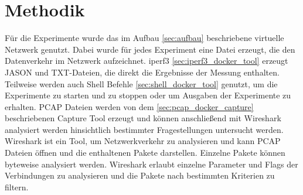 \section{Methodik}
\label{sec:allgemeine_methodik}

Für die Experimente wurde das im Aufbau \ref{sec:aufbau} beschriebene virtuelle Netzwerk genutzt.
Dabei wurde für jedes Experiment eine Datei erzeugt, die den Datenverkehr im Netzwerk aufzeichnet.
iperf3 \ref{sec:iperf3_docker_tool} erzeugt JASON und TXT-Dateien, die direkt die Ergebnisse der Messung enthalten.
Teilweise werden auch Shell Befehle \ref{sec:shell_docker_tool} genutzt, um die Experimente zu starten und zu stoppen oder um Ausgaben der Experimente zu erhalten.
PCAP Dateien werden von dem \ref{sec:pcap_docker_capture} beschriebenen Capture Tool erzeugt und können anschließend mit Wireshark \cite{wireshark} analysiert werden hinsichtlich bestimmter Fragestellungen untersucht werden.
Wireshark ist ein Tool, um Netzwerkverkehr zu analysieren und kann PCAP Dateien öffnen und die enthaltenen Pakete darstellen.
Einzelne Pakete können byteweise analysiert werden.
Wireshark erlaubt einzelne Parameter und Flags der Verbindungen zu analysieren und die Pakete nach bestimmten Kriterien zu filtern.